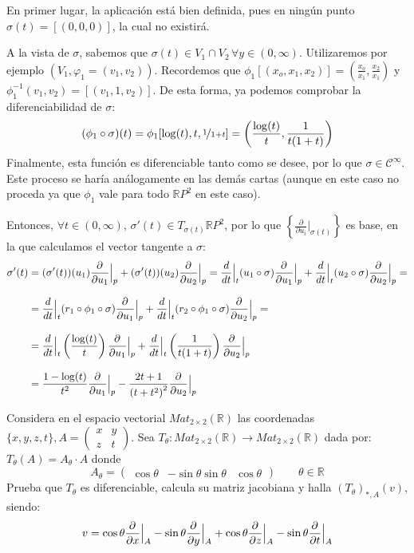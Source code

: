 \begin{sol}
    En primer lugar, la aplicaci\'on est\'a bien definida, pues en ning\'un punto $\sigma(t) = [(0,0,0)]$, la cual no existir\'a. 

    A la vista de $\sigma$, sabemos que $\sigma(t) \in V_1 \cap V_2 \, \forall y \in (0, \infty)$. Utilizaremos por ejemplo $(V_1, \varphi_1=(v_1,v_2))$. Recordemos que $\phi_1[(x_o, x_1, x_2)] = \left( \frac{x_o}{x_1}, \frac{x_2}{x_1}\right)$ y $\phi_1^{-1}(v_1, v_2) = [(v_1, 1, v_2)]$. De esta forma, ya podemos comprobar la diferenciabilidad de $\sigma$:
    $$(\phi_1 \circ \sigma)(t) = \phi_1[\log(t), t, \nicefrac{1}{1+t}] = \left(\dfrac{\log(t)}{t}, \dfrac{1}{t(1+t)}\right)$$
    Finalmente, esta funci\'on es diferenciable tanto como se desee, por lo que $\sigma \in \mathcal C^{\infty}$. Este proceso se har\'ia an\'alogamente en las dem\'as cartas (aunque en este caso no proceda ya que $\phi_1$ vale para todo $\mathbb RP^2$ en este caso). 

    Entonces, $\forall t \in (0, \infty)$, $\sigma'(t) \in T_{\sigma(t)}\mathbb RP^2$, por lo que $\left\{ \frac{\partial}{\partial u_i} \big|_{\sigma(t)}\right\}$ es base, en la que calculamos el vector tangente a $\sigma$:
    \[\begin{split} \sigma'(t) & = (\sigma'(t))(u_1) \dfrac{\partial^{} }{\partial u_1} \Big|_p + (\sigma'(t))(u_2) \dfrac{\partial^{} }{\partial u_2} \Big|_p = \dfrac{d}{dt} \Big|_t (u_1 \circ \sigma) \dfrac{\partial^{} }{\partial u_1} \Big|_p + \dfrac{d}{dt} \Big|_t (u_2 \circ \sigma) \dfrac{\partial^{} }{\partial u_2} \Big|_p =\\[3mm]
    & = \dfrac{d}{dt} \Big|_t (r_1 \circ \phi_1 \circ \sigma) \dfrac{\partial^{} }{\partial u_1} \Big|_p + \dfrac{d}{dt} \Big|_t (r_2 \circ \phi_1 \circ \sigma) \dfrac{\partial^{} }{\partial u_2} \Big|_p = \\[3mm]
    & =\dfrac{d}{dt} \Big|_t \left( \dfrac{\log(t)}{t}\right) \dfrac{\partial^{} }{\partial u_1} \Big|_p + \dfrac{d}{dt} \Big|_t \left( \dfrac{1}{t(1+t)}\right) \dfrac{\partial^{} }{\partial u_2} \Big|_p \\[3mm]
    & = \dfrac{1-\log(t)}{t^2} \dfrac{\partial^{} }{\partial u_1} \Big|_p - \dfrac{2t+1}{\left(t+t^2\right)^2} \dfrac{\partial^{} }{\partial u_2} \Big|_p\end{split} \]
\end{sol}
\begin{ejer}
    [2.9] Considera en el espacio vectorial $Mat_{2\times 2}(\mathbb R)$ las coordenadas $\{x, y, z, t\}, A = \left(\begin{smallmatrix} x & y \\ z & t \end{smallmatrix}\right)$. Sea $T_{\theta} : Mat_{2\times 2}(\mathbb R) \to Mat_{2\times 2}(\mathbb R)$  dada por: $T_{\theta}(A) = A_{\theta} \cdot A$ donde 
    $$A_{\theta} =  \begin{pmatrix}
         \cos  \theta  & -\sin \theta \sin \theta &  \cos  \theta  
    \end{pmatrix} \qquad \theta \in \mathbb R$$
Prueba que $T_{\theta}$ es diferenciable, calcula su matriz jacobiana y halla $(T_{\theta})_{*,A}(v)$,
siendo:
$$v = \cos \theta \dfrac{\partial^{} }{\partial x} \Big|_A - \sin\theta \dfrac{\partial^{} }{\partial y} \Big|_A + \cos  \theta \dfrac{\partial^{} }{\partial z} \Big|_A - \sin\theta \dfrac{\partial^{} }{\partial t} \Big|_A$$
\end{ejer}
